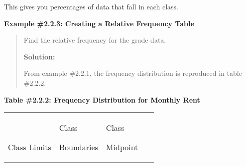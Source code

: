 \documentclass[]{book}
\begin{document}
This gives you percentages of data that fall in each class.

\textbf{Example \#2.2.3: Creating a Relative Frequency Table}

\begin{quote}
Find the relative frequency for the grade data.

\textbf{Solution:}

From example \#2.2.1, the frequency distribution is reproduced in
table \#2.2.2.
\end{quote}

\textbf{Table \#2.2.2: Frequency Distribution for Monthly Rent}

\begin{longtable}[]{@{}llll@{}}
\toprule
\endhead
\begin{minipage}[t]{0.18\columnwidth}\raggedright
~

Class Limits\strut
\end{minipage} & \begin{minipage}[t]{0.23\columnwidth}\raggedright
Class

Boundaries\strut
\end{minipage} & \begin{minipage}[t]{0.14\columnwidth}\raggedright
Class

Midpoint\strut
\end{minipage} & \begin{minipage}[t]{0.15\columnwidth}\raggedright
~


\end{minipage}
\end{longtable}
\end{document}
